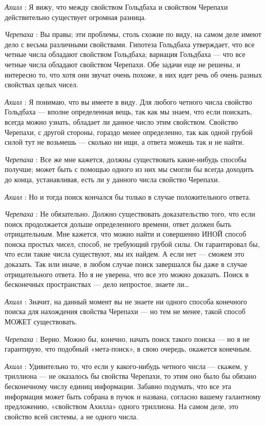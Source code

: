 \emph{Ахилл} : Я вижу, что между свойством Гольдбаха и свойством Черепахи действительно существует огромная разница.

\emph{Черепаха} : Вы правы; эти проблемы, столь схожие по виду, на самом деле имеют дело с весьма различными свойствами. Гипотеза Гольдбаха утверждает, что все четные числа обладают свойством Гольдбаха; вариация Гольдбаха --- что все четные числа обладают свойством Черепахи. Обе задачи еще не решены, и интересно то, что хотя они звучат очень похоже, в них идет речь об очень разных свойствах целых чисел.

\emph{Ахилл} : Я понимаю, что вы имеете в виду. Для любого четного числа свойство Гольдбаха --- вполне определенная вещь, так как мы знаем, что если поискать, всегда можно узнать, обладает ли данное число этим свойством. Свойство Черепахи, с другой стороны, гораздо менее определенно, так как одной грубой силой тут не возьмешь --- сколько ни ищи, а ответа можешь так и не найти.

\emph{Черепаха} : Все же мне кажется, должны существовать какие-нибудь способы получше; может быть с помощью одного из них мы смогли бы всегда доходить до конца, устанавливая, есть ли у данного числа свойство Черепахи.

\emph{Ахилл} : Но и тогда поиск кончался бы только в случае положительного ответа.

\emph{Черепаха} : Не обязательно. Должно существовать доказательство того, что если поиск продолжается дольше определенного времени, ответ должен быть отрицательным. Мне кажется, что можно найти и совершенно ИНОЙ способ поиска простых чисел, способ, не требующий грубой силы. Он гарантировал бы, что если такие числа существуют, мы их найдем. А если нет --- сможем это доказать. Так или иначе, в любом случае поиск завершался бы даже в случае отрицательного ответа. Но я не уверена, что все это можно доказать. Поиск в бесконечных пространствах --- дело непростое, знаете ли\ldots{}

\emph{Ахилл} : Значит, на данный момент вы не знаете ни одного способа конечного поиска для нахождения свойства Черепахи --- но тем не менее, такой способ МОЖЕТ существовать.

\emph{Черепаха} : Верно. Можно бы, конечно, начать поиск такого поиска --- но я не гарантирую, что подобный «мета-поиск», в свою очередь, окажется конечным.

\emph{Ахилл} : Удивительно то, что если у какого-нибудь четного числа --- скажем, у триллиона --- не оказалось бы свойства Черепахи, то этим оно было бы обязано бесконечному числу единиц информации. Забавно подумать, что все эта информация может быть собрана в пучок и названа, согласно вашему галантному предложению, «свойством Ахилла» одного триллиона. На самом деле, это свойство всей системы, а не одного числа.

